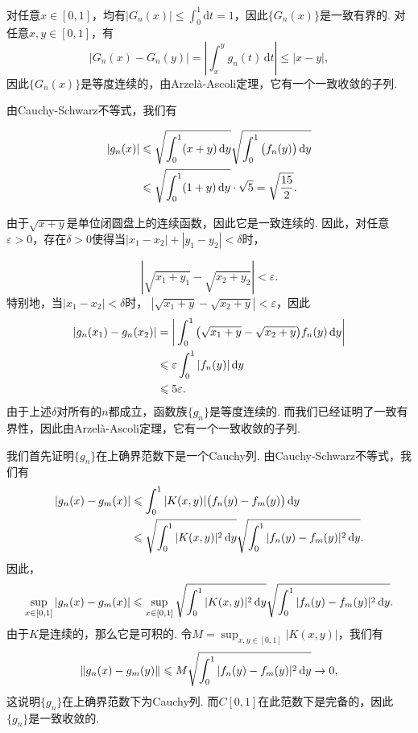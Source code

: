 \begin{ans}
  对任意$x\in[0,1]$，均有$|G_n(x)|\le\int_0^1\mathrm dt=1$，因此$\{G_n(x)\}$是一致有界的. 对任意$x,y\in[0,1]$，有
  \[ |G_n(x)-G_n(y)| = | \int_x^yg_n(t)\,\mathrm dt | \le |x-y|, \]
  因此$\{G_n(x)\}$是等度连续的，由Arzel\`a-Ascoli定理，它有一个一致收敛的子列.
\end{ans}

\begin{ans}
  \begin{enumb}
    \item 由Cauchy-Schwarz不等式，我们有
  \end{enumb}
  \begin{align*}
    |g_n(x)| & \leqslant \sqrt{\int_0^1(x+y)\,\mathrm dy}
    \sqrt{\int_0^1\big(f_n(y)\big)\,\mathrm dy} \\
    & \leqslant \sqrt{\int_0^1(1+y)\,\mathrm dy}\cdot\sqrt5
    =\sqrt{\frac{15}2}.
  \end{align*}
  \begin{enumc}\setcounter{enumi}{1}
    \item 由于$\sqrt{x+y}$是单位闭圆盘上的连续函数，因此它是一致连续的. 因此，对任意$\varepsilon>0$，存在$\delta>0$使得当$|x_1-x_2|+|y_1-y_2|<\delta$时，
  \end{enumc}
  \[ |\sqrt{x_1+y_1}-\sqrt{x_2+y_2}|<\varepsilon. \]
  特别地，当$|x_1-x_2|<\delta$时，
  $|\sqrt{x_1+y}-\sqrt{x_2+y}|<\varepsilon$，因此
  \begin{align*}
    |g_n(x_1)-g_n(x_2)| & = 
      \bigg| \int_0^1\big( \sqrt{x_1+y}-\sqrt{x_2+y} \big)f_n(y)\,\mathrm dy \bigg|\\
      & \leqslant \varepsilon\int_0^1|f_n(y)|\,\mathrm dy\\
      & \leqslant 5\varepsilon.
  \end{align*}
  由于上述$\delta$对所有的$n$都成立，函数族$\{g_n\}$是等度连续的. 而我们已经证明了一致有界性，因此由Arzel\`a-Ascoli定理，它有一个一致收敛的子列.
\end{ans}

\begin{ans}
  我们首先证明$\{g_n\}$在上确界范数下是一个Cauchy列. 由Cauchy-Schwarz不等式，我们有
  \begin{align*}
    |g_n(x)-g_m(x)| & \leqslant \int_0^1|K(x,y)|
      \big( f_n(y)-f_m(y) \big)\,\mathrm dy \\
      & \leqslant \sqrt{\int_0^1|K(x,y)|^2\,\mathrm dy}
            \sqrt{\int_0^1|f_n(y)-f_m(y)|^2\,\mathrm dy}.
  \end{align*}
  因此，
  \[
    \sup_{x\in[0,1]}|g_n(x)-g_m(x)|
    \le \sup_{x\in[0,1]}
      \sqrt{\int_0^1|K(x,y)|^2\,\dy}
      \sqrt{\int_0^1|f_n(y)-f_m(y)|^2\,\dy}.
  \]
  由于$K$是连续的，那么它是可积的. 令$M=\sup_{x,y\in[0,1]}|K(x,y)|$，我们有
  \[
    \| g_n(x)-g_m(y) \| \leqslant M\sqrt{\int_0^1|f_n(y)-f_m(y)|^2\,\mathrm dy} \to 0,
  \]
  这说明$\{g_n\}$在上确界范数下为Cauchy列. 而$C[0,1]$在此范数下是完备的，因此$\{g_n\}$是一致收敛的.
\end{ans}



